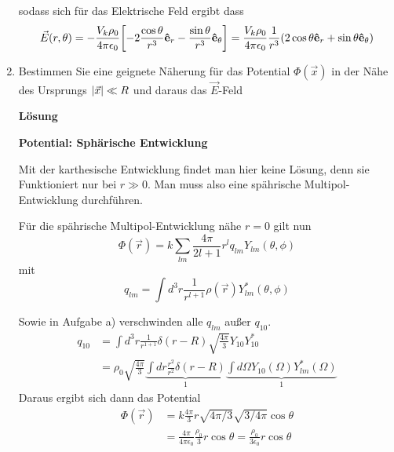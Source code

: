 \begin{enumerate}[label=\alph*)]
    sodass sich für das Elektrische Feld ergibt dass
    \begin{equation}
      \vec E (r,\theta)= 
      -\frac{V_k\rho_0}{4\pi\epsilon_0}
      \qty[-2 \frac{\cos\theta}{r^3}\vu e_r 
           -\frac{\sin\theta}{r^3}\vu e_\theta]
           = \frac{V_k\rho_0}{4\pi\epsilon_0}\frac{1}{r^3}
           (2\cos\theta \vu e_r + \sin\theta \vu e_\theta)
    \end{equation}

  \item Bestimmen Sie eine geignete Näherung für das Potential 
    $\Phi(\vec x)$ in der Nähe des Ursprungs $\abs{\vec x}\ll R$ und daraus
    das $\vec E$-Feld

    \textbf{Lösung} 
    
    \textbf{Potential: Sphärische Entwicklung} 

    Mit der karthesische Entwicklung findet man hier keine Lösung, denn
    sie Funktioniert nur bei $r\gg0$. Man
    muss also eine spährische Multipol-Entwicklung durchführen.

    Für die spährische Multipol-Entwicklung nähe $r=0$ gilt nun
    \begin{equation}
      \Phi(\vec r)=k\sum_{lm}\frac{4\pi}{2l+1}r^lq_{lm}Y_{lm}(\theta,\phi)
    \end{equation}
    mit
    \begin{equation}
      q_{lm}=\int d^3 r \frac{1}{r^{l+1}}\rho(\vec r)Y^*_{lm}(\theta,\phi) 
    \end{equation}

    Sowie in Aufgabe a) verschwinden alle $q_{lm}$ außer $q_{10}$.
    \begin{equation*}
      \begin{split}
        q_{10}
        &=
        \int d^3r \frac{1}{r^{1+1}}\delta(r-R)
        \sqrt{\frac{4\pi}{3}}Y_{10}Y^*_{10} \\
        &= \rho_0 \sqrt{\frac{4\pi}{3}}
        \underbrace{\int dr \frac{r^2}{r^2} \delta(r-R)}_{1}
        \underbrace{\int d\Omega Y_{10}(\Omega)Y^*_{lm}(\Omega)}_{1}
      \end{split}
    \end{equation*}
    Daraus ergibt sich dann das Potential
    \begin{equation}
      \begin{split}
        \Phi(\vec r)
        &=k \frac{4\pi}{3} r \sqrt{4\pi/3} \sqrt{3/4\pi} \cos\theta\\
        &=\frac{4\pi}{4\pi\epsilon_0}\frac{\rho_0}{3}r\cos\theta
        =\frac{\rho_0}{3\epsilon_0}r\cos\theta 
      \end{split}
    \end{equation}


\end{enumerate}
